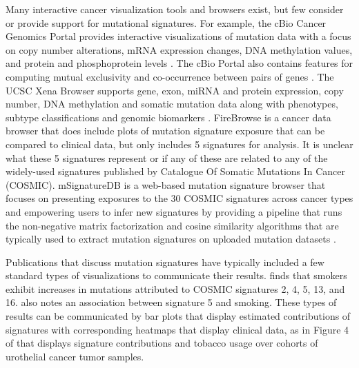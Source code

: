 \documentclass[12pt, letterpaper]{article}
\begin{document}
Many interactive cancer visualization tools and browsers exist, but few consider or provide support for mutational signatures. 
For example, the cBio Cancer Genomics Portal provides interactive visualizations of mutation data with a focus on copy number alterations, mRNA expression changes, DNA methylation values, and protein and phosphoprotein levels \citep{cerami2012cbio,gao2013integrative}.
The cBio Portal also contains features for computing mutual exclusivity and co-occurrence between pairs of genes \citep{cerami2012cbio,gao2013integrative}.
The UCSC Xena Browser supports gene, exon, miRNA and protein expression, copy number, DNA methylation and somatic mutation data along with phenotypes, subtype classifications and genomic biomarkers \citep{goldman2014ucsc,goldman2016ucsc}.
FireBrowse is a cancer data browser that does include plots of mutation signature exposure that can be compared to clinical data, but only includes 5 signatures for analysis.
It is unclear what these 5 signatures represent or if any of these are related to any of the widely-used signatures published by Catalogue Of Somatic Mutations In Cancer (COSMIC).
mSignatureDB is a web-based mutation signature browser that focuses on presenting exposures to the 30 COSMIC signatures across cancer types and empowering users to infer new signatures by providing a pipeline that runs the non-negative matrix factorization and cosine similarity algorithms that are typically used to extract mutation signatures on uploaded mutation datasets \citep{huang2017msignaturedb}.

Publications that discuss mutation signatures have typically included a few standard types of visualizations to  communicate their results.
\citet{alexandrov2016mutational} finds that smokers exhibit increases in mutations attributed to COSMIC signatures 2, 4, 5, 13, and 16. \citet{kim2016somatic} also notes an association between signature 5 and smoking.
These types of results can be communicated by bar plots that display estimated contributions of signatures with corresponding heatmaps that display clinical data, as in Figure 4 of \citet{kim2016somatic} that displays signature contributions and tobacco usage over cohorts of urothelial cancer tumor samples.
\end{document}
